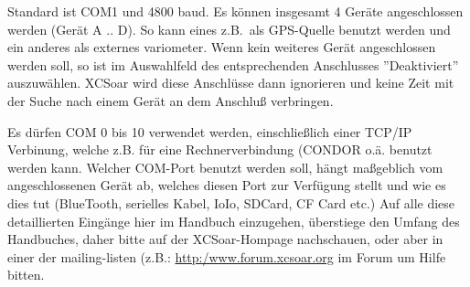 Standard ist COM1 und 4800 baud. Es können insgesamt 4 Geräte angeschlossen werden (Gerät A .. D).
So kann eines z.B.\ als GPS-Quelle benutzt werden und ein anderes als externes variometer.
Wenn kein weiteres Gerät angeschlossen werden soll, so ist im Auswahlfeld des entsprechenden Anschlusses ''Deaktiviert'' auszuwählen.
\textsf{XCSoar} wird diese Anschlüsse dann ignorieren und keine Zeit mit der Suche nach einem Gerät an dem Anschluß verbringen.

Es dürfen COM 0 bis 10 verwendet werden,  einschließlich einer TCP/IP Verbinung, welche z.B. für eine
Rechnerverbindung (\textsc{CONDOR} o.ä. benutzt werden kann. Welcher COM-Port benutzt werden soll, hängt maßgeblich vom angeschlossenen Gerät ab,
welches diesen Port zur Verfügung stellt und wie es dies tut (BlueTooth, serielles Kabel, IoIo, SDCard, CF Card etc.) Auf alle diese detaillierten
Eingänge hier im Handbuch einzugehen, überstiege den Umfang des Handbuches, daher bitte auf der \textsf{XCSoar}-Hompage nachschauen, oder aber
in einer der mailing-listen  (z.B.:  \url{http:/www.forum.xcsoar.org} im Forum um Hilfe bitten.

